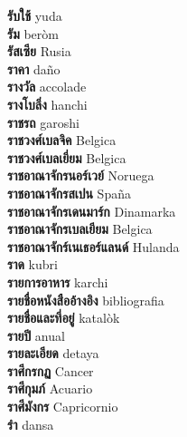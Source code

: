 \textbf{ รับใช้  } yuda \\
\textbf{ รัม  } beròm \\
\textbf{ รัสเซีย  } Rusia \\
\textbf{ ราคา  } daño \\
\textbf{ รางวัล  } accolade \\
\textbf{ รางโบลิ่ง  } hanchi \\
\textbf{ ราชรถ  } garoshi \\
\textbf{ ราชวงศ์เบลจิค  } Belgica \\
\textbf{ ราชวงศ์เบลเยี่ยม  } Belgica \\
\textbf{ ราชอาณาจักรนอร์เวย์  } Noruega \\
\textbf{ ราชอาณาจักรสเปน  } Spaña \\
\textbf{ ราชอาณาจักรเดนมาร์ก  } Dinamarka \\
\textbf{ ราชอาณาจักรเบลเยียม  } Belgica \\
\textbf{ ราชอาณาจักร์เนเธอร์แลนด์  } Hulanda \\
\textbf{ ราด  } kubri \\
\textbf{ รายการอาหาร  } karchi \\
\textbf{ รายชื่อหนังสืออ้างอิง  } bibliografia \\
\textbf{ รายชื่อและที่อยู่  } katalòk \\
\textbf{ รายปี  } anual \\
\textbf{ รายละเอียด  } detaya \\
\textbf{ ราศีกรกฏ  } Cancer \\
\textbf{ ราศีกุมภ์  } Acuario \\
\textbf{ ราศีมังกร  } Capricornio \\
\textbf{ รำ  } dansa \\

